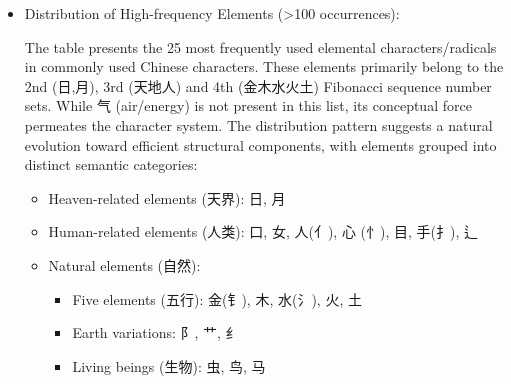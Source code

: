 \documentclass[
  11pt,
  letterpaper,
]{article}
\providecommand{\tightlist}{%
  \setlength{\itemsep}{0pt}\setlength{\parskip}{0pt}}
\begin{document}
\begin{itemize}
\item
  Distribution of High-frequency Elements (\textgreater100 occurrences):

  The table presents the 25 most frequently used elemental
  characters/radicals in commonly used Chinese characters. These
  elements primarily belong to the 2nd (日,月), 3rd (天地人) and 4th
  (金木水火土) Fibonacci sequence number sets. While 气 (air/energy) is
  not present in this list, its conceptual force permeates the character
  system. The distribution pattern suggests a natural evolution toward
  efficient structural components, with elements grouped into distinct
  semantic categories:

  \begin{itemize}
  \tightlist
  \item
    Heaven-related elements (天界): 日, 月
  \item
    Human-related elements (人类): 口, 女, 人(亻), 心 (忄), 目, 手(扌),
    辶
  \item
    Natural elements (自然):

    \begin{itemize}
    \tightlist
    \item
      Five elements (五行): 金(钅), 木, 水(氵), 火, 土
    \item
      Earth variations: 阝, 艹, 纟
    \item
      Living beings (生物): 虫, 鸟, 马
    \end{itemize}
  \end{itemize}


\end{itemize}
\end{document}

